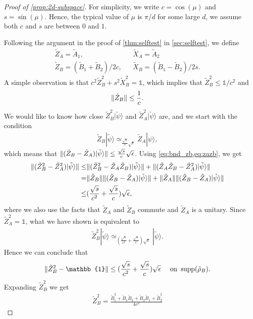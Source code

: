 \documentclass[11pt,letterpaper]{article}
\newcommand{\ket}[1]{|#1\rangle}
\DeclarePairedDelimiter{\norm}{\lVert}{\rVert}
\DeclareMathOperator{\supp}{supp}
\newcommand{\1}{\mathbb{1}}
\newcommand{\tA}{\tilde{A}}
\newcommand{\tB}{\tilde{B}}
\newcommand{\tZ}{\tilde{Z}}
\newcommand{\tX}{\tilde{X}}
\newcommand{\tpsi}{\tilde{\psi}}
\newcommand{\appd}[1]{\simeq_{#1}}
\theoremstyle{definition}
\begin{document}
\begin{proof}[Proof of \cref{prop:2d-subspace}]
	For simplicity, we write $c = \cos(\mu)$ and $s = \sin(\mu)$.
	Hence, the typical value of $\mu$ is $\pi/d$ for some large $d$, we assume both $c$ and $s$ are between $0$ and $1$.
	
	Following the argument in the proof of \cref{thm:selftest} in \cref{sec:selftest}, we define
	\begin{align*}	
	\tilde{Z}_A = \tA_1, && \tX_A = \tA_2\\
	\tilde{Z}_B = (\tB_1+\tB_2)/2c, && \tX_B = (\tB_1-\tB_2)/2s.
	\end{align*}
	A simple observation is that $c^2 \tZ_B^2 + s^2 \tX_B^2 = \1$, which implies that 
	$ \tZ_B^2 \leq \1/c^2$ and 
	\begin{align}
		\label{eq:bnd_zb}
		\norm{\tZ_B} \leq \frac{1}{c}.
	\end{align}
	We would like to know how close $\tZ_B^2\ket{\tpsi}$ and $\tZ_A^2\ket{\tpsi}$ are,
	and we start with the condition 
	\begin{align}
		\label{eq:zazb}
		\tZ_B \ket{\tpsi} \appd{\frac{\sqrt{s}}{c}\sqrt{\epsilon}} \tZ_A \ket{\psi},
	\end{align}
	which means that $\norm{ (\tZ_B-\tZ_A)\ket{\tpsi}} \leq \frac{\sqrt{s}}{c}\sqrt{\epsilon}$.
	Using \cref{eq:bnd_zb,eq:zazb}, we get
	\begin{align}
		\norm{ (\tZ_B^2 - \tZ_A^2)\ket{\tpsi}} \leq& \norm{ (\tZ_B^2 - \tZ_A\tZ_B)\ket{\tpsi}} + \norm{ (\tZ_A\tZ_B - \tZ_A^2)\ket{\tpsi}}\\
		=&\norm{\tZ_B}\norm{ (\tZ_B - \tZ_A)\ket{\tpsi}} + \norm{\tZ_A}\norm{ (\tZ_B - \tZ_A)\ket{\tpsi}}\\
		\leq&(\frac{\sqrt{s}}{c^2}+ \frac{\sqrt{s}}{c})\sqrt{\epsilon},
	\end{align}
	where we also use the facts that $\tZ_A$ and $\tZ_B$ commute and $\tZ_A$ is a unitary.
	Since $\tZ_A^2 = \1$, what we have shown is equivalent to 
	\begin{align}
		\tZ_B^2 \ket{\tpsi} \appd{(\frac{\sqrt{s}}{c^2}+ \frac{\sqrt{s}}{c})\sqrt{\epsilon}} \ket{\tpsi}.
	\end{align}
	Hence we can conclude that 
	\begin{align}
	\norm{\tZ_B^2  -\1} \leq (\frac{\sqrt{s}}{c^2}+ \frac{\sqrt{s}}{c})\sqrt{\epsilon} \quad\text{ on }  \supp(\tilde{\rho}_B).
	\end{align}
	Expanding $\tilde{Z}_B^2$ we get
	\begin{align*}
		 \tilde{Z}_B^2 = \frac{\tB_1^2 + \tB_1\tB_2 + \tB_2\tB_1 + \tB_2^2}{4c^2}

\end{align*}
\end{proof}
\end{document}
